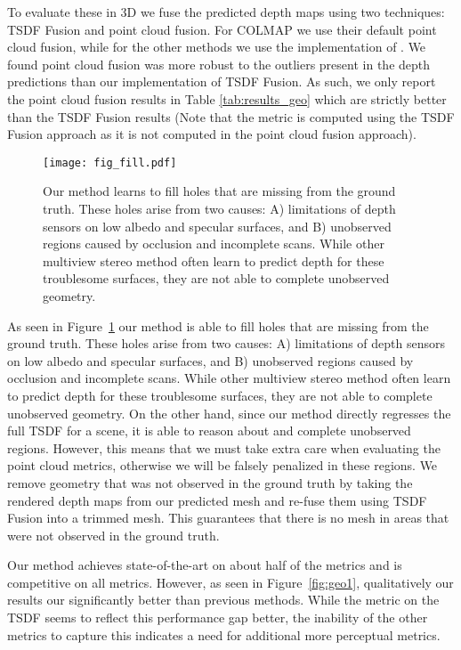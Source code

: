 \documentclass[runningheads]{llncs}
\begin{document}
To evaluate these in 3D we fuse the predicted depth maps using two techniques: TSDF Fusion \cite{curless1996volumetric} and point cloud fusion.
For COLMAP we use their default point cloud fusion, while for the other methods we use the implementation of \cite{galliani2015massively}. We found point cloud fusion was more robust to the outliers present in the depth predictions than our implementation of TSDF Fusion. As such, we only report the point cloud fusion results in Table \ref{tab:results_geo} which are strictly better than the TSDF Fusion results (Note that the  metric is computed using the TSDF Fusion approach as it is not computed in the point cloud fusion approach).

\begin{figure}
\centering
\texttt{[image: fig\_fill.pdf]}
\caption{Our method learns to fill holes that are missing from the ground truth.
These holes arise from two causes: A) limitations of depth sensors on low albedo and specular surfaces, and B) unobserved regions caused by occlusion and incomplete scans. While other multiview stereo method often learn to predict depth for these troublesome surfaces, they are not able to complete unobserved geometry.
}
\label{fig:fill}
\end{figure}

As seen in Figure~\ref{fig:fill} our method is able to fill holes that are missing from the ground truth.
These holes arise from two causes: A) limitations of depth sensors on low albedo and specular surfaces, and B) unobserved regions caused by occlusion and incomplete scans. While other multiview stereo method often learn to predict depth for these troublesome surfaces, they are not able to complete unobserved geometry. On the other hand, since our method directly regresses the full TSDF for a scene, it is able to reason about and complete unobserved regions. However, this means that we must take extra care when evaluating the point cloud metrics, otherwise we will be falsely penalized in these regions. We remove geometry that was not observed in the ground truth by taking the rendered depth maps from our predicted mesh and re-fuse them using TSDF Fusion into a trimmed mesh. This guarantees that there is no mesh in areas that were not observed in the ground truth.



Our method achieves state-of-the-art on about half of the metrics and is competitive on all metrics. However, as seen in Figure~\ref{fig:geo1}, qualitatively our results our significantly better than previous methods. While the  metric on the TSDF seems to reflect this performance gap better, the inability of the other metrics to capture this indicates a need for additional more perceptual metrics.
\end{document}
